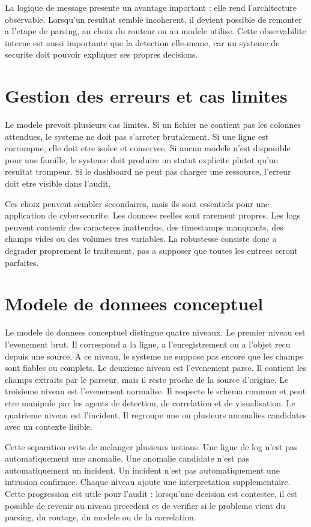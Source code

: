 La logique de message presente un avantage important : elle rend l'architecture observable. Lorsqu'un resultat semble incoherent, il devient possible de remonter a l'etape de parsing, au choix du routeur ou au modele utilise. Cette observabilite interne est aussi importante que la detection elle-meme, car un systeme de securite doit pouvoir expliquer ses propres decisions.

\section{Gestion des erreurs et cas limites}
Le modele prevoit plusieurs cas limites. Si un fichier ne contient pas les colonnes attendues, le systeme ne doit pas s'arreter brutalement. Si une ligne est corrompue, elle doit etre isolee et conservee. Si aucun modele n'est disponible pour une famille, le systeme doit produire un statut explicite plutot qu'un resultat trompeur. Si le dashboard ne peut pas charger une ressource, l'erreur doit etre visible dans l'audit.

Ces choix peuvent sembler secondaires, mais ils sont essentiels pour une application de cybersecurite. Les donnees reelles sont rarement propres. Les logs peuvent contenir des caracteres inattendus, des timestamps manquants, des champs vides ou des volumes tres variables. La robustesse consiste donc a degrader proprement le traitement, pas a supposer que toutes les entrees seront parfaites.

\section{Modele de donnees conceptuel}
Le modele de donnees conceptuel distingue quatre niveaux. Le premier niveau est l'evenement brut. Il correspond a la ligne, a l'enregistrement ou a l'objet recu depuis une source. A ce niveau, le systeme ne suppose pas encore que les champs sont fiables ou complets. Le deuxieme niveau est l'evenement parse. Il contient les champs extraits par le parseur, mais il reste proche de la source d'origine. Le troisieme niveau est l'evenement normalise. Il respecte le schema commun et peut etre manipule par les agents de detection, de correlation et de visualisation. Le quatrieme niveau est l'incident. Il regroupe une ou plusieurs anomalies candidates avec un contexte lisible.

Cette separation evite de melanger plusieurs notions. Une ligne de log n'est pas automatiquement une anomalie. Une anomalie candidate n'est pas automatiquement un incident. Un incident n'est pas automatiquement une intrusion confirmee. Chaque niveau ajoute une interpretation supplementaire. Cette progression est utile pour l'audit : lorsqu'une decision est contestee, il est possible de revenir au niveau precedent et de verifier si le probleme vient du parsing, du routage, du modele ou de la correlation.

